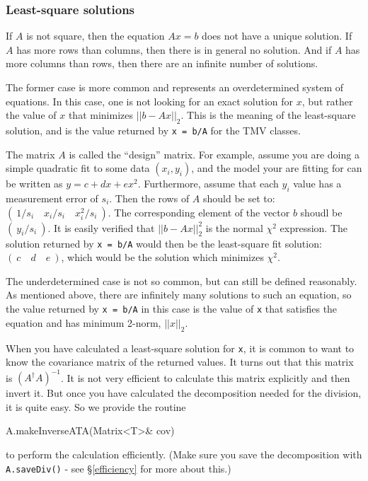 \documentclass[twoside,letterpaper,11pt]{article}
\renewcommand{\tt}[1]{{\lstinline {#1}}}
\begin{document}
\subsubsection{Least-square solutions}
\label{leastsquare}

If $A$ is not square, then the equation $A x = b$ does not have a unique solution.
If $A$ has more rows than columns, then there is in general no solution.
And if $A$ has more columns than rows, then there are an infinite 
number of solutions.  

The former case is more common and represents an overdetermined system of 
equations.  In this case, one is not looking for an exact solution
for $x$, but rather the value of $x$ that minimizes $||b - A x||_2$.  This is the 
meaning of the least-square
solution, and is the value returned by \tt{x = b/A} for the TMV classes.  

The matrix $A$ is called the ``design'' matrix.  For example, assume you are doing
a simple quadratic fit to some data $(x_i,y_i)$, and the model your are fitting for
can be written as
$y = c + dx + ex^2$.  Furthermore, assume that each
$y_i$ value has a measurement error of $s_i$.  Then the rows of $A$ should
be set to: $( ~1/s_i \quad x_i/s_i \quad x_i^2/s_i ~ )$.  The corresponding
element of the vector $b$ shoudl be $( ~ y_i/s_i ~ )$.  It is easily verified that
$||b-Ax||_2^2$ is the normal $\chi^2$ expression.
The solution returned by
\tt{x = b/A} would then be the least-square fit solution: $(~c \quad d \quad e~)$,
which would be the solution which minimizes $\chi^2$.

The underdetermined case is not so common, but can still be defined reasonably.  
As mentioned above, there are infinitely many solutions to such an equation, so the
value returned by \tt{x = b/A} in this case is the value of \tt{x} that satisfies the 
equation and has minimum 2-norm, $||x||_2$.

When you have calculated a least-square solution for \tt{x}, it is common to want 
to know the covariance matrix of the returned values.  It turns out that this
matrix is $(A^\dagger A)^{-1}$.  It is not very efficient to calculate this matrix
explicitly and then invert it.  But once you have calculated the decomposition
needed for the division, it is quite easy.  So we provide the routine 
\begin{tmvcode}
A.makeInverseATA(Matrix<T>& cov)
\end{tmvcode}
to perform the calculation efficiently.  (Make sure you save the decomposition with 
\tt{A.saveDiv()} - see \S\ref{efficiency} for more about this.)
\end{document}
